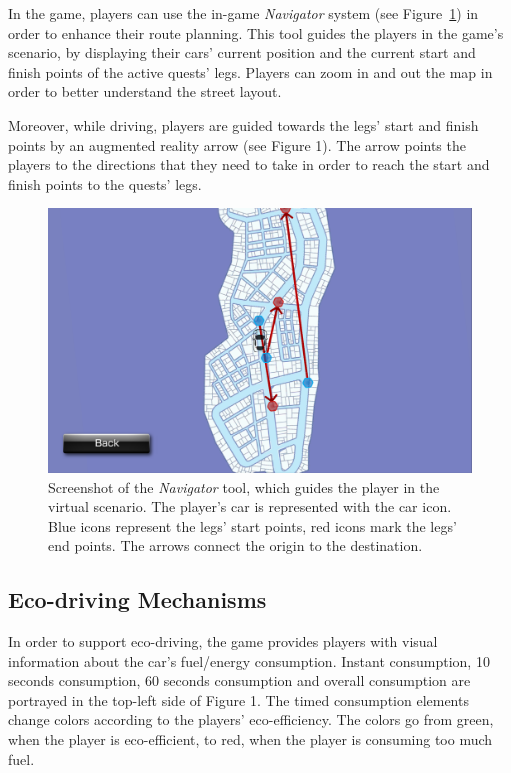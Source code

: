 \documentclass[preprint,authoryear,12pt]{elsarticle}
\begin{document}
In the game, players can use the in-game \textit{Navigator} system (see Figure~\ref{fig:iCO2_navigator}) in order to enhance their route planning. This tool guides the players in the game's scenario, by displaying their cars' current position and the current start and finish points of the active quests' legs. Players can zoom in and out the map in order to better understand the street layout.

Moreover, while driving, players are guided towards the legs' start and finish points by an augmented reality arrow (see Figure 1). The arrow points the players to the directions that they need to take in order to reach the start and finish points to the quests' legs.

\begin{figure}[htb]
\begin{center}
\includegraphics[width=.95\linewidth]{ijhcs14-img/iCO2_navigator}
\caption{Screenshot of the \textit{Navigator} tool, which guides the player in the virtual scenario. The player's car is represented with the car icon. Blue icons represent the legs' start points, red icons mark the legs' end points. The arrows connect the origin to the destination.\label{fig:iCO2_navigator}}
\end{center}
\end{figure}

\subsection{Eco-driving Mechanisms}

In order to support eco-driving, the game provides players with visual information about the car's fuel/energy consumption. Instant consumption, 10 seconds consumption, 60 seconds consumption and overall consumption are portrayed in the top-left side of Figure 1. The timed consumption elements change colors according to the players' eco-efficiency. The colors go from green, when the player is eco-efficient, to red, when the player is consuming too much fuel.
\end{document}
